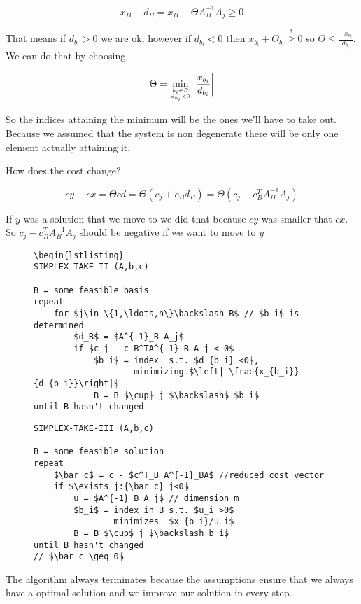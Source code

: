 \[x_B - d_B = x_B - \Theta A_B^{-1} A_j \geq 0\]

That means if $d_{b_i}>0$ we are ok, however if $d_{b_i} <0$ then $x_{b_i} +\Theta_{b_i} \stackrel{!}{\geq} 0$ so $\Theta \leq \frac{-x_{b_i}}{d_{b_i}}$. We can do that by choosing

\[\Theta = \min_{{b_i\in B}\atop {d_{b_i} <0}} \left| \frac{x_{b_i}}{d_{b_i}}\right |\]

So the indices attaining the minimum will be the ones we'll have to take out. Because we assumed that the system is non degenerate there will be only one element actually attaining it. %

How does the cost change?

\[cy -cx = \Theta cd = \Theta(c_j+c_Bd_B) = \Theta(c_j - c_B^TA^{-1}_B A_j)\]

If $y$ was a solution that we move to we did that because $cy$ was smaller that $cx$. So $c_j - c_B^TA^{-1}_B A_j$ should be negative if we want to move to $y$

\begin{figure}[h]
\begin{center}
\begin{lstlisting}
\begin{lstlisting}
SIMPLEX-TAKE-II (A,b,c)

B = some feasible basis
repeat 
    for $j\in \{1,\ldots,n\}\backslash B$ // $b_i$ is determined
        $d_B$ = $A^{-1}_B A_j$
        if $c_j - c_B^TA^{-1}_B A_j < 0$
            $b_i$ = index  s.t. $d_{b_i} <0$, 
                    minimizing $\left| \frac{x_{b_i}}{d_{b_i}}\right|$
            B = B $\cup$ j $\backslash$ $b_i$
until B hasn't changed
\end{lstlisting}
\end{center}
\end{figure}

\begin{figure}[h]
\begin{center}
\begin{lstlisting}
SIMPLEX-TAKE-III (A,b,c)

B = some feasible solution
repeat
    $\bar c$ = c - $c^T_B A^{-1}_BA$ //reduced cost vector
    if $\exists j:{\bar c}_j<0$ 
        u = $A^{-1}_B A_j$ // dimension m
        $b_i$ = index in B s.t. $u_i >0$ 
                minimizes  $x_{b_i}/u_i$
        B = B $\cup$ j $\backslash b_i$ 
until B hasn't changed 
// $\bar c \geq 0$ 
\end{lstlisting}
\end{center}
\end{figure}
The algorithm always terminates because the assumptions ensure that we always have a optimal solution and we improve our solution in every step.

